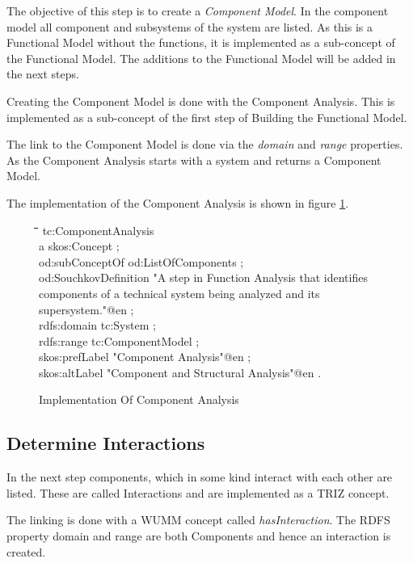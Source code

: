 \documentclass[11pt,a4paper]{article}
\newenvironment{code}{\tt \begin{tabbing}
\hskip12pt\=\hskip12pt\=\hskip12pt\=\hskip12pt\=\hskip5cm\=\hskip5cm\=\kill}
{\end{tabbing}}
\begin{document}
The objective of this step is to create a \textit{Component Model}.  In the
component model all component and subsystems of the system are listed.  As
this is a Functional Model without the functions, it is implemented as a
sub-concept of the Functional Model.  The additions to the Functional Model
will be added in the next steps.

Creating the Component Model is done with the Component Analysis.  This is
implemented as a sub-concept of the first step of Building the Functional
Model.

The link to the Component Model is done via the \textit{domain} and
\textit{range} properties.  As the Component Analysis starts with a system and
returns a Component Model.

The implementation of the Component Analysis is shown in figure
\ref{fig:implementation_component_analysis}.

\begin{figure}[ht]
  \centering
  \begin{code}
    tc:ComponentAnalysis\\
    \> a skos:Concept ;\\
    \> od:subConceptOf od:ListOfComponents ;\\
    \> od:SouchkovDefinition "A step in Function Analysis that identifies\\
    \> \> components of a technical system being analyzed and its supersystem."@en ;\\
    \> rdfs:domain tc:System ;\\
    \> rdfs:range tc:ComponentModel ;\\
    \> skos:prefLabel "Component Analysis"@en ;\\
    \> skos:altLabel "Component and Structural Analysis"@en .
  \end{code}
  \caption{Implementation Of Component Analysis}
  \label{fig:implementation_component_analysis}
\end{figure}

\subsection{Determine Interactions}

In the next step components, which in some kind interact with each other are
listed.  These are called Interactions and are implemented as a TRIZ concept.

The linking is done with a WUMM concept called \textit{hasInteraction}.  The
RDFS property domain and range are both Components and hence an interaction is
created.
\end{document}

